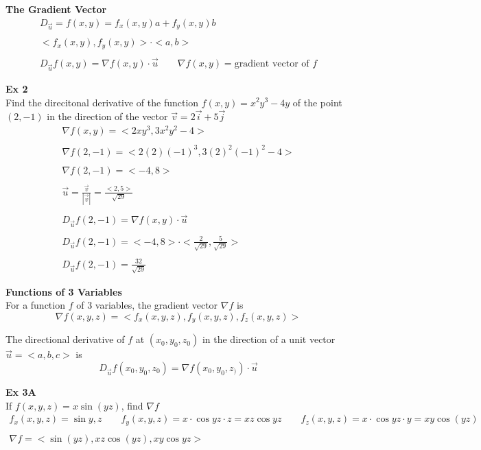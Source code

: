 \documentclass{article}
\begin{document}
    \textbf{The Gradient Vector}
    \[
        \begin{gathered}
        D_{\vec{u}}=f(x,y)=f_{x}(x,y)a+f_{y}(x,y)b\\
        ~\\
        <f_{x}(x,y) ,f_{y}(x,y)> \cdot < a, b > \\
        ~\\
        D_{\vec{u}}f(x,y)= \nabla f(x,y) \cdot \vec{u} \qquad \nabla f(x,y)=\text{gradient vector of }f
        \end{gathered}
    \]

    \textbf{Ex 2}\\
    Find the direcitonal derivative of the function $ f(x,y) =x^{2}y^{3}-4y  $ of the point $ (2,-1) $ in the direction of the vector $ \vec{v}=2\vec{i}+5\vec{j} $
    \[
        \begin{gathered}
        \nabla f(x,y)=< 2xy^{3}, 3x^{2}y^{2}-4>\\
        ~\\
        \nabla f(2,-1)=< 2(2)(-1)^{3} ,3(2)^{2}(-1)^{2}-4 >\\
        ~\\
        \nabla f(2,-1) = < -4, 8 >\\
        ~\\
        \vec{u}= \frac{\vec{v}}{| \vec{v} |}= \frac{< 2, 5 > }{\sqrt{29}}\\
        ~\\
        D_{\vec{u}}f(2,-1)=\nabla f(x,y) \cdot \vec{u}\\
        ~\\
        D_{\vec{u}}f(2,-1)= < -4, 8 > \cdot  < \frac{2}{\sqrt{29} } , \frac{5}{\sqrt{29} }  >\\
        ~\\
        \boxed{D_{\vec{u}}f(2,-1)=\frac{32}{\sqrt{29}}}     
        \end{gathered}
    \]

    \textbf{Functions of 3 Variables}\\
    For a function $ f $ of $ 3 $ variables, the gradient vector $ \nabla f $ is
    \[
        \nabla f(x,y,z)= < f_{x}(x,y,z) , f_{y}(x,y,z) , f_{z}(x,y,z) > 
    \]

    The directional derivative of $ f $ at $ (x_{0},y_{0},z_{0}) $ in the direction of a unit vector $ \vec{u} =< a, b, c > $ is
    \[
        D_{\vec{u}}f(x_{0},y_{0},z_{0})= \nabla f(x_{0},y_{0},z_{)}) \cdot \vec{u} 
    \]
    
    \textbf{Ex 3A}\\
    If $ f(x,y,z) =x\sin{(yz)}$, find $ \nabla f $
    \[
        \begin{gathered}
        f_{x}(x,y,z)=\sin{y,z} \qquad f_{y}(x,y,z)=x \cdot \cos{yz} \cdot z = xz \cos{yz} \qquad f_{z}(x,y,z)= x \cdot \cos{yz} \cdot y=xy\cos{(yz)}\\
        ~\\
        \boxed{\nabla f = < \sin{(yz)}, xz\cos{(yz)}, xy\cos{yz}>} 
        \end{gathered}
    \]
    
\end{document}
